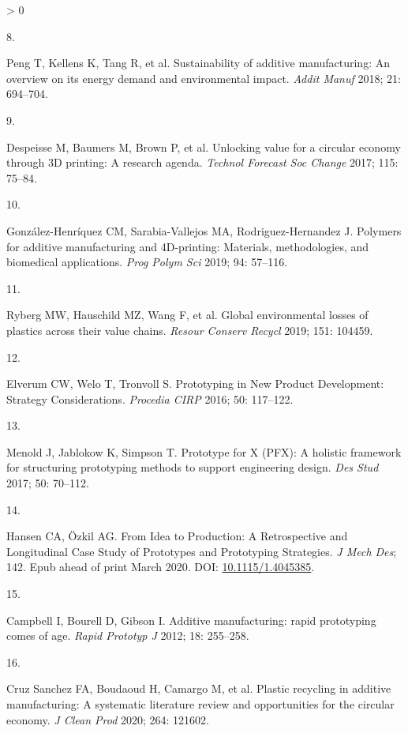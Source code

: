 \documentclass[
  12pt]{article}
\newlength{\cslhangindent}
\newlength{\csllabelwidth}
\newenvironment{CSLReferences}[2] %
 {%
  \setlength{\parindent}{0pt}
  \ifodd #1 \everypar{\setlength{\hangindent}{\cslhangindent}}\ignorespaces\fi
  \ifnum #2 > 0
  \setlength{\parskip}{#2\baselineskip}
  \fi
 }%
 {}
\newcommand{\CSLLeftMargin}[1]{\parbox[t]{\csllabelwidth}{#1}}
\newcommand{\CSLRightInline}[1]{\parbox[t]{\linewidth - \csllabelwidth}{#1}\break}
\begin{document}
\begin{CSLReferences}{0}{0}
\leavevmode\hypertarget{ref-Peng2018}{}%
\CSLLeftMargin{8. }
\CSLRightInline{Peng T, Kellens K, Tang R, et al. {Sustainability of additive manufacturing: An overview on its energy demand and environmental impact}. \emph{Addit Manuf} 2018; 21: 694--704.}

\leavevmode\hypertarget{ref-Despeisse2016}{}%
\CSLLeftMargin{9. }
\CSLRightInline{Despeisse M, Baumers M, Brown P, et al. {Unlocking value for a circular economy through 3D printing: A research agenda}. \emph{Technol Forecast Soc Change} 2017; 115: 75--84.}

\leavevmode\hypertarget{ref-GonzalezHenriquez2019}{}%
\CSLLeftMargin{10. }
\CSLRightInline{González-Henríquez CM, Sarabia-Vallejos MA, Rodriguez-Hernandez J. {Polymers for additive manufacturing and 4D-printing: Materials, methodologies, and biomedical applications}. \emph{Prog Polym Sci} 2019; 94: 57--116.}

\leavevmode\hypertarget{ref-Ryberg2019}{}%
\CSLLeftMargin{11. }
\CSLRightInline{Ryberg MW, Hauschild MZ, Wang F, et al. {Global environmental losses of plastics across their value chains}. \emph{Resour Conserv Recycl} 2019; 151: 104459.}

\leavevmode\hypertarget{ref-Elverum2016}{}%
\CSLLeftMargin{12. }
\CSLRightInline{Elverum CW, Welo T, Tronvoll S. {Prototyping in New Product Development: Strategy Considerations}. \emph{Procedia CIRP} 2016; 50: 117--122.}

\leavevmode\hypertarget{ref-Menold2017}{}%
\CSLLeftMargin{13. }
\CSLRightInline{Menold J, Jablokow K, Simpson T. {Prototype for X (PFX): A holistic framework for structuring prototyping methods to support engineering design}. \emph{Des Stud} 2017; 50: 70--112.}

\leavevmode\hypertarget{ref-Hansen2020}{}%
\CSLLeftMargin{14. }
\CSLRightInline{Hansen CA, Özkil AG. {From Idea to Production: A Retrospective and Longitudinal Case Study of Prototypes and Prototyping Strategies}. \emph{J Mech Des}; 142. Epub ahead of print March 2020. DOI: \href{https://doi.org/10.1115/1.4045385}{10.1115/1.4045385}.}

\leavevmode\hypertarget{ref-Campbell2012}{}%
\CSLLeftMargin{15. }
\CSLRightInline{Campbell I, Bourell D, Gibson I. {Additive manufacturing: rapid prototyping comes of age}. \emph{Rapid Prototyp J} 2012; 18: 255--258.}

\leavevmode\hypertarget{ref-CruzSanchez2020}{}%
\CSLLeftMargin{16. }
\CSLRightInline{Cruz Sanchez FA, Boudaoud H, Camargo M, et al. {Plastic recycling in additive manufacturing: A systematic literature review and opportunities for the circular economy}. \emph{J Clean Prod} 2020; 264: 121602.}


\end{CSLReferences}
\end{document}
